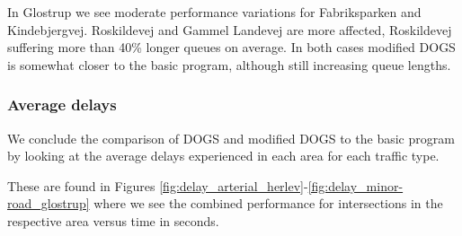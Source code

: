 In Glostrup we see moderate performance variations for Fabriksparken and Kindebjergvej. Roskildevej and Gammel Landevej are more affected, Roskildevej suffering more than 40\% longer queues on average. In both cases modified DOGS is somewhat closer to the basic program, although still increasing queue lengths.

\subsubsection*{Average delays}
We conclude the comparison of DOGS and modified DOGS to the basic program by looking at the average delays experienced in each area for each traffic type. 

These are found in Figures \ref{fig:delay_arterial_herlev}-\ref{fig:delay_minor-road_glostrup} where we see the combined performance for intersections in the respective area versus time in seconds.

